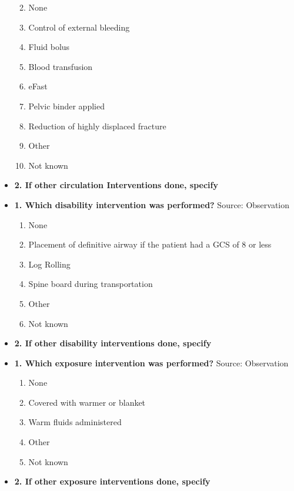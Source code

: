 \documentclass[
]{scrartcl}
\providecommand{\tightlist}{%
  \setlength{\itemsep}{0pt}\setlength{\parskip}{0pt}}\usepackage{longtable,booktabs,array}
\begin{document}
\begin{itemize}
  \begin{enumerate}
  \def\labelenumi{\arabic{enumi}.}
  \tightlist
  \item
    None
  \item
    Control of external bleeding
  \item
    Fluid bolus
  \item
    Blood transfusion
  \item
    eFast
  \item
    Pelvic binder applied
  \item
    Reduction of highly displaced fracture
  \item
    Other
  \item
    Not known
  \end{enumerate}
\item
  \textbf{2. If other circulation Interventions done, specify}
\item
  \textbf{1. Which disability intervention was performed?} Source:
  Observation

  \begin{enumerate}
  \def\labelenumi{\arabic{enumi}.}
  \tightlist
  \item
    None
  \item
    Placement of definitive airway if the patient had a GCS of 8 or less
  \item
    Log Rolling
  \item
    Spine board during transportation
  \item
    Other
  \item
    Not known
  \end{enumerate}
\item
  \textbf{2. If other disability interventions done, specify}
\item
  \textbf{1. Which exposure intervention was performed?} Source:
  Observation

  \begin{enumerate}
  \def\labelenumi{\arabic{enumi}.}
  \tightlist
  \item
    None
  \item
    Covered with warmer or blanket
  \item
    Warm fluids administered
  \item
    Other
  \item
    Not known
  \end{enumerate}
\item
  \textbf{2. If other exposure interventions done, specify}
\end{itemize}
\end{document}
